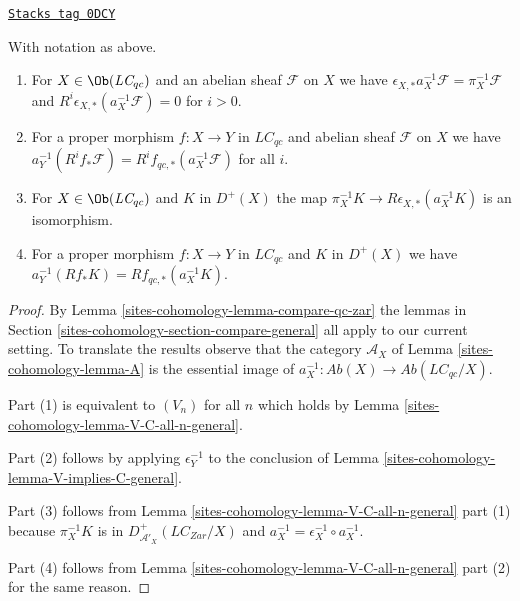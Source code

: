 \begin{lemma}[V C all n]
\label{sites-cohomology-lemma-V-C-all-n}
\href{https://stacks.math.columbia.edu/tag/0DCY}{\texttt{Stacks tag 0DCY}}

With notation as above.
\begin{enumerate}
\item For $X \in \Ob(\textit{LC}_{qc})$ and an abelian sheaf $\mathcal{F}$
on $X$ we have $\epsilon_{X, *}a_X^{-1}\mathcal{F} = \pi_X^{-1}\mathcal{F}$
and $R^i\epsilon_{X, *}(a_X^{-1}\mathcal{F}) = 0$ for $i > 0$.
\item For a proper morphism $f : X \to Y$ in $\textit{LC}_{qc}$
and abelian sheaf $\mathcal{F}$ on $X$ we have
$a_Y^{-1}(R^if_*\mathcal{F}) = R^if_{qc, *}(a_X^{-1}\mathcal{F})$
for all $i$.
\item For $X \in \Ob(\textit{LC}_{qc})$ and $K$ in $D^+(X)$ the map
$\pi_X^{-1}K \to R\epsilon_{X, *}(a_X^{-1}K)$ is an isomorphism.
\item For a proper morphism $f : X \to Y$ in $\textit{LC}_{qc}$
and $K$ in $D^+(X)$ we have $a_Y^{-1}(Rf_*K) = Rf_{qc, *}(a_X^{-1}K)$.
\end{enumerate}
\end{lemma}

\begin{proof}
By Lemma \ref{sites-cohomology-lemma-compare-qc-zar} the lemmas in
Section \ref{sites-cohomology-section-compare-general} all apply to our current setting.
To translate the results
observe that the category $\mathcal{A}_X$ of Lemma \ref{sites-cohomology-lemma-A}
is the essential image of
$a_X^{-1} : \textit{Ab}(X) \to \textit{Ab}(\textit{LC}_{qc}/X)$.

\medskip\noindent
Part (1) is equivalent to $(V_n)$ for all $n$ which holds by
Lemma \ref{sites-cohomology-lemma-V-C-all-n-general}.

\medskip\noindent
Part (2) follows by applying $\epsilon_Y^{-1}$ to the conclusion of
Lemma \ref{sites-cohomology-lemma-V-implies-C-general}.

\medskip\noindent
Part (3) follows from Lemma \ref{sites-cohomology-lemma-V-C-all-n-general} part (1)
because $\pi_X^{-1}K$ is in $D^+_{\mathcal{A}'_X}(\textit{LC}_{Zar}/X)$
and $a_X^{-1} = \epsilon_X^{-1} \circ a_X^{-1}$.

\medskip\noindent
Part (4) follows from Lemma \ref{sites-cohomology-lemma-V-C-all-n-general} part (2)
for the same reason.
\end{proof}


